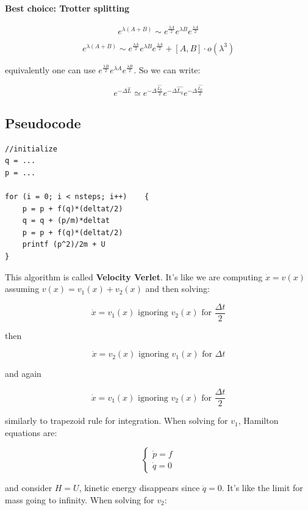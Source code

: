 \documentclass[a4paper, italian, openany]{book}
\begin{document}
\paragraph{Best choice: Trotter splitting}

$$e^{\lambda(A+B)} \sim e^{\frac{\lambda A}{2}}e^{\lambda B}e^{\frac{\lambda A}{2}}$$

$$e^{\lambda(A+B)} \sim e^{\frac{\lambda A}{2}}e^{\lambda B}e^{\frac{\lambda A}{2}} + \left [ A, B \right ] \cdot o(\lambda^3)$$

equivalently one can use $e^{\frac{\lambda B}{2}}e^{\lambda A}e^{\frac{\lambda B}{2}}$. So we can write:

$$e^{-\Delta \hat{L}} \simeq e^{-\Delta \frac{\hat{L_p}}{2}} e^{-\Delta \hat{L_q}} e^{-\Delta \frac{\hat{L_p}}{2}}$$

\subsection{Pseudocode}

\begin{lstlisting}
//initialize
q = ... 
p = ...

for (i = 0; i < nsteps; i++)	{
	p = p + f(q)*(deltat/2)
	q = q + (p/m)*deltat
	p = p + f(q)*(deltat/2)
	printf (p^2)/2m + U
}
\end{lstlisting}

This algorithm is called \textbf{Velocity Verlet}. It's like we are computing $\dot{x} = v(x)$ assuming $v(x) = v_1(x) + v_2(x)$ and then solving:

$$\dot{x} = v_1(x) \mbox{ ignoring } v_2(x) \mbox{ for } \frac{\Delta t}{2}$$

then

$$\dot{x} = v_2(x) \mbox{ ignoring } v_1(x) \mbox{ for } \Delta t$$

and again

$$\dot{x} = v_1(x) \mbox{ ignoring } v_2(x) \mbox{ for } \frac{\Delta t}{2}$$

similarly to trapezoid rule for integration.\newline
When solving for $v_1$, Hamilton equations are:

$$\begin{cases}
\dot{p} = f \\
\dot{q} = 0
\end{cases}$$

and consider $H = U$, kinetic energy disappears since $\dot{q} = 0$. It's like the limit for mass going to infinity.
When solving for $v_2$:
\end{document}
